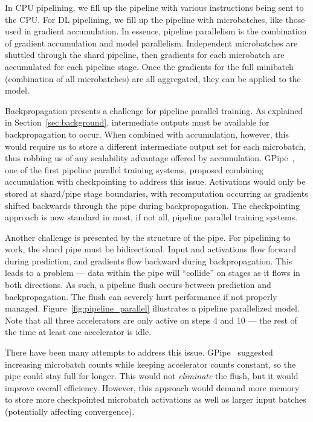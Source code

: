 In CPU pipelining, we fill up the pipeline with various instructions being sent to the CPU\cite{shen2013modern}. For DL pipelining, we fill up the pipeline with microbatches, like those used in gradient accumulation. In essence, pipeline parallelism is the combination of gradient accumulation and model parallelism. Independent microbatches are shuttled through the shard pipeline, then gradients for each microbatch are accumulated for each pipeline stage. Once the gradients for the full minibatch (combination of all microbatches) are all aggregated, they can be applied to the model.

Backpropagation presents a challenge for pipeline parallel training. As explained in Section~\ref{sec:background}, intermediate outputs must be available for backpropagation to occur. When combined with accumulation, however, this would require us to store a different intermediate output set for each microbatch, thus robbing us of any scalability advantage offered by accumulation. GPipe~\cite{gpipe2018}, one of the first pipeline parallel training systems, proposed combining accumulation with checkpointing to address this issue. Activations would only be stored at shard/pipe stage boundaries, with recomputation occurring as gradients shifted backwards through the pipe during backpropagation. The checkpointing approach is now standard in most, if not all, pipeline parallel training systems.

Another challenge is presented by the structure of the pipe. For pipelining to work, the shard pipe must be bidirectional. Input and activations flow forward during prediction, and gradients flow backward during backpropagation. This leads to a problem --- data within the pipe will ``collide'' on stages as it flows in both directions. As such, a pipeline flush occurs between prediction and backpropagation. The flush can severely hurt performance if not properly managed. Figure~\ref{fig:pipeline_parallel} illustrates a pipeline parallelized model. Note that all three accelerators are only active on steps 4 and 10 --- the rest of the time at least one accelerator is idle.

There have been many attempts to address this issue. GPipe~\cite{gpipe2018} suggested increasing microbatch counts while keeping accelerator counts constant, so the pipe could stay full for longer. This would not \textit{eliminate} the flush, but it would improve overall efficiency. However, this approach would demand more memory to store more checkpointed microbatch activations as well as larger input batches (potentially affecting convergence).

